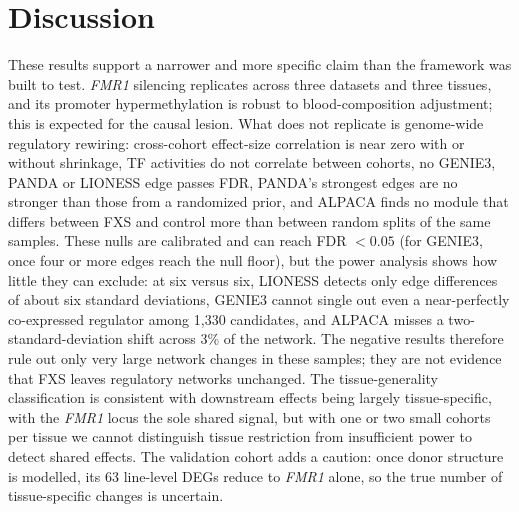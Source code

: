 \documentclass[journal]{IEEEtran}
\newcommand{\gene}[1]{\textit{#1}}
\begin{document}
\section{Discussion}
These results support a narrower and more specific claim than the framework was built to test. \gene{FMR1} silencing replicates across three datasets and three tissues, and its promoter hypermethylation is robust to blood-composition adjustment; this is expected for the causal lesion. What does not replicate is genome-wide regulatory rewiring: cross-cohort effect-size correlation is near zero with or without shrinkage, TF activities do not correlate between cohorts, no GENIE3, PANDA or LIONESS edge passes FDR, PANDA's strongest edges are no stronger than those from a randomized prior, and ALPACA finds no module that differs between FXS and control more than between random splits of the same samples. These nulls are calibrated and can reach FDR $<0.05$ (for GENIE3, once four or more edges reach the null floor), but the power analysis shows how little they can exclude: at six versus six, LIONESS detects only edge differences of about six standard deviations, GENIE3 cannot single out even a near-perfectly co-expressed regulator among 1,330 candidates, and ALPACA misses a two-standard-deviation shift across 3\% of the network. The negative results therefore rule out only very large network changes in these samples; they are not evidence that FXS leaves regulatory networks unchanged. The tissue-generality classification is consistent with downstream effects being largely tissue-specific, with the \gene{FMR1} locus the sole shared signal, but with one or two small cohorts per tissue we cannot distinguish tissue restriction from insufficient power to detect shared effects. The validation cohort adds a caution: once donor structure is modelled, its 63 line-level DEGs reduce to \gene{FMR1} alone, so the true number of tissue-specific changes is uncertain.
\end{document}
